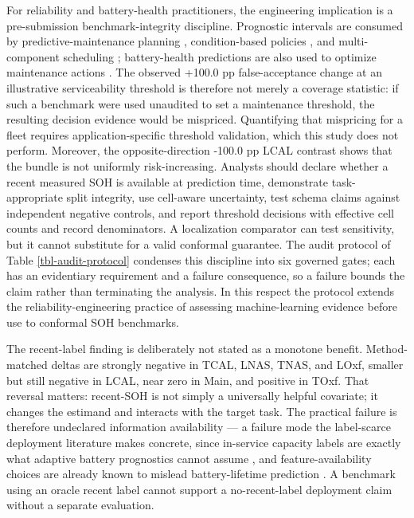 \documentclass[
  number,
  preprint]{elsarticle}
\begin{document}
For reliability and battery-health practitioners, the engineering
implication is a pre-submission benchmark-integrity discipline.
Prognostic intervals are consumed by predictive-maintenance planning
\citep{mitici2023dynamic, pedersen2022optimizing}, condition-based
policies \citep{zhuang2023prognostic, depater2021predictive}, and
multi-component scheduling
\citep{wang2026dynamic, wang2025multiobjective}; battery-health
predictions are also used to optimize maintenance actions
\citep{wang2026multiaction}. The observed +100.0 pp false-acceptance
change at an illustrative serviceability threshold is therefore not
merely a coverage statistic: if such a benchmark were used unaudited to
set a maintenance threshold, the resulting decision evidence would be
mispriced. Quantifying that mispricing for a fleet requires
application-specific threshold validation, which this study does not
perform. Moreover, the opposite-direction -100.0 pp LCAL contrast shows
that the bundle is not uniformly risk-increasing. Analysts should
declare whether a recent measured SOH is available at prediction time,
demonstrate task-appropriate split integrity, use cell-aware
uncertainty, test schema claims against independent negative controls,
and report threshold decisions with effective cell counts and record
denominators. A localization comparator can test sensitivity, but it
cannot substitute for a valid conformal guarantee. The audit protocol of
Table \ref{tbl-audit-protocol} condenses this discipline into six
governed gates; each has an evidentiary requirement and a failure
consequence, so a failure bounds the claim rather than terminating the
analysis. In this respect the protocol extends the
reliability-engineering practice of assessing machine-learning evidence
before use
\citep{zio2022prognostics, chen2024evaluating, panic2027simple, salinascamus2025comprehensive}
to conformal SOH benchmarks.

The recent-label finding is deliberately not stated as a monotone
benefit. Method-matched deltas are strongly negative in TCAL, LNAS,
TNAS, and LOxf, smaller but still negative in LCAL, near zero in Main,
and positive in TOxf. That reversal matters: recent-SOH is not simply a
universally helpful covariate; it changes the estimand and interacts
with the target task. The practical failure is therefore undeclared
information availability --- a failure mode the label-scarce deployment
literature makes concrete, since in-service capacity labels are exactly
what adaptive battery prognostics cannot assume
\citep{zhang2022adaptive, pan2024probabilistic}, and
feature-availability choices are already known to mislead
battery-lifetime prediction \citep{geslin2023selecting}. A benchmark
using an oracle recent label cannot support a no-recent-label deployment
claim without a separate evaluation.
\end{document}
